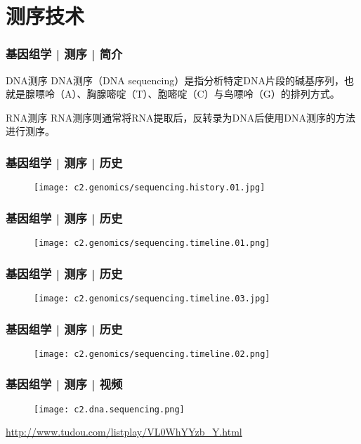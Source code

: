 \section{测序技术}
\begin{frame}
  \frametitle{基因组学 | 测序 | 简介}
  \begin{block}{DNA测序}
DNA测序（DNA sequencing）是指分析特定DNA片段的碱基序列，也就是腺嘌呤（A）、胸腺嘧啶（T）、胞嘧啶（C）与鸟嘌呤（G）的排列方式。
  \end{block}
  \pause
  \begin{block}{RNA测序}
RNA测序则通常将RNA提取后，反转录为DNA后使用DNA测序的方法进行测序。
  \end{block}
\end{frame}

\begin{frame}
  \frametitle{基因组学 | 测序 | 历史}
  \begin{figure}
    \centering
    \texttt{[image: c2.genomics/sequencing.history.01.jpg]}
  \end{figure}
\end{frame}

\begin{frame}
  \frametitle{基因组学 | 测序 | 历史}
  \begin{figure}
    \centering
    \texttt{[image: c2.genomics/sequencing.timeline.01.png]}
  \end{figure}
\end{frame}

\begin{frame}
  \frametitle{基因组学 | 测序 | 历史}
  \begin{figure}
    \centering
    \texttt{[image: c2.genomics/sequencing.timeline.03.jpg]}
  \end{figure}
\end{frame}

\begin{frame}
  \frametitle{基因组学 | 测序 | 历史}
  \begin{figure}
    \centering
    \texttt{[image: c2.genomics/sequencing.timeline.02.png]}
  \end{figure}
\end{frame}

\begin{frame}
  \frametitle{基因组学 | 测序 | 视频}
  \begin{figure}
    \centering
    \texttt{[image: c2.dna.sequencing.png]}
  \end{figure}
  \begin{center}
    \href{http://www.tudou.com/listplay/VL0WhYYzb_Y.html}{http://www.tudou.com/listplay/VL0WhYYzb\_Y.html}
  \end{center}
\end{frame}

